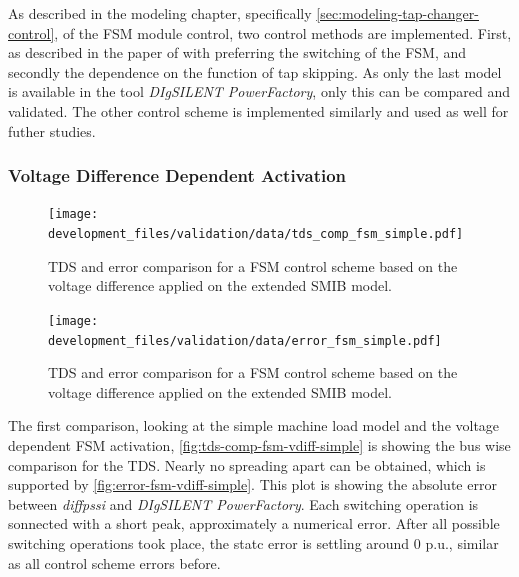 As described in the modeling chapter, specifically \autoref{sec:modeling-tap-changer-control}, of the \acs{FSM} module control, two control methods are implemented.
First, as described in the paper of \textcite{burlakin_2024} with preferring the switching of the \acs{FSM}, and secondly the dependence on the function of tap skipping.
As only the last model is available in the tool \textit{DIgSILENT PowerFactory}, only this can be compared and validated. 
The other control scheme is implemented similarly and used as well for futher studies.

\subsubsection{Voltage Difference Dependent Activation}

\begin{figure}[htbp!]
    \centering
    \texttt{[image: development\_files/validation/data/tds\_comp\_fsm\_simple.pdf]}
    \caption[\acs{TDS} and error comparison for a \acs{FSM} control scheme based on the voltage difference applied on the extended \acs{SMIB} model]{\acs{TDS} and error comparison for a \acs{FSM} control scheme based on the voltage difference applied on the extended \acs{SMIB} model.}
    \label{fig:tds-comp-fsm-vdiff-simple}
\end{figure}

\begin{figure}[htbp!]
    \centering
    \texttt{[image: development\_files/validation/data/error\_fsm\_simple.pdf]}
    \caption[\acs{TDS} and error comparison for a \acs{FSM} control scheme based on the voltage difference applied on the extended \acs{SMIB} model]{\acs{TDS} and error comparison for a \acs{FSM} control scheme based on the voltage difference applied on the extended \acs{SMIB} model.}
    \label{fig:error-fsm-vdiff-simple}
\end{figure}

The first comparison, looking at the simple machine load model and the voltage dependent \acs{FSM} activation, \autoref{fig:tds-comp-fsm-vdiff-simple} is showing the bus wise comparison for the \acs{TDS}.
Nearly no spreading apart can be obtained, which is supported by \autoref{fig:error-fsm-vdiff-simple}.
This plot is showing the absolute error between \textit{diffpssi} and \textit{DIgSILENT PowerFactory}.
Each switching operation is sonnected with a short peak, approximately a numerical error.
After all possible switching operations took place, the statc error is settling around $0$ p.u., similar as all control scheme errors before.

